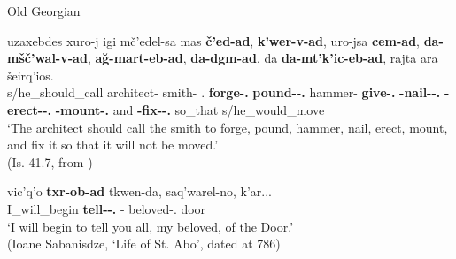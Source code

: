 \begin{exe}
	\ex\label{verbderiv-ex26}
	Old Georgian
	\begin{xlist}
		
		
			\ex\label{verbderiv-ex26a}
			\gll  uzaxebdes xuro-j igi mč’edel-sa mas \textbf{č’ed-ad}, \textbf{k'wer-v-ad}, uro-jsa \textbf{cem-ad}, \textbf{da-mšč’wal-v-ad}, \textbf{a\u{g}-mart-eb-ad}, \textbf{da-dgm-ad}, da \textbf{da-mt’k’ic-eb-ad}, rajta ara šeirq’ios. \\
			s/he\_should\_call architect-{\Nom} {\Dist} smith-{\Dat} {\Def}.{\Dat} \textbf{forge-{\Vn}.{\Advb}} \textbf{pound-{\Tm}-{\Vn}.{\Advb}} hammer-{\Gen} \textbf{give-{\Vn}.{\Advb}} \textbf{{\Pv}-nail-{\Tm}-{\Vn}.{\Advb}} \textbf{{\Pv}-erect-{\Tm}-{\Vn}.{\Advb}} \textbf{{\Pv}-mount-{\Vn}.{\Advb}} and \textbf{{\Pv}-fix-{\Tm}-{\Vn}.{\Advb}} so\_that {\Neg} s/he\_would\_move \\
			\trans `The architect should call the smith to forge, pound, hammer, nail, erect, mount, and fix it so that it will not be moved.’  \\
			\hfill (Is. 41.7, from \cites[]{gippertOGeo})
		
		
		
			\ex\label{verbderiv-ex26b}
			\gll  vic'q'o \textbf{txr-ob-ad} tkwen-da, saq'warel-no, k'ar...\\
			I\_will\_begin \textbf{tell-{\Tm}-{\Vn}.{\Advb}} {\Spl}-{\Advb} beloved-{\Pl}.{\Voc} door \\
			\trans `I will begin to tell you all, my beloved, of the Door.' \\
			\hfill (Ioane Sabanisdze, `Life of St. Abo', dated at 786)
		
		
	\end{xlist}
\end{exe}

